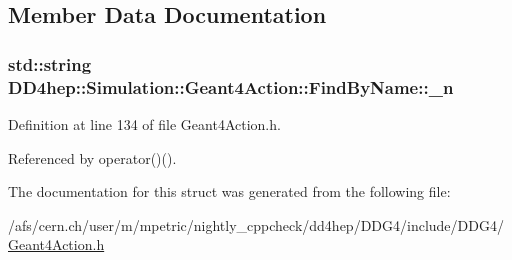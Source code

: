 \subsection{Member Data Documentation}
\hypertarget{struct_d_d4hep_1_1_simulation_1_1_geant4_action_1_1_find_by_name_ab2021d91a8c4487ef27bce6cb6d69966}{
\subsubsection[{\_\-n}]{\setlength{\rightskip}{0pt plus 5cm}std::string {\bf DD4hep::Simulation::Geant4Action::FindByName::\_\-n}}}
\label{struct_d_d4hep_1_1_simulation_1_1_geant4_action_1_1_find_by_name_ab2021d91a8c4487ef27bce6cb6d69966}


Definition at line 134 of file Geant4Action.h.

Referenced by operator()().

The documentation for this struct was generated from the following file:\begin{DoxyCompactItemize}
\item 
/afs/cern.ch/user/m/mpetric/nightly\_\-cppcheck/dd4hep/DDG4/include/DDG4/\hyperlink{_geant4_action_8h}{Geant4Action.h}\end{DoxyCompactItemize}

